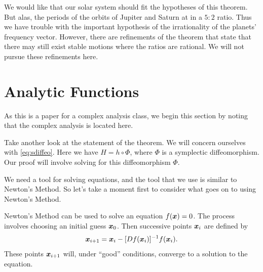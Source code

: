 \documentclass[twoside,letterpaper,10pt]{article}
\begin{document}
We would like that our solar system should fit the hypotheses of this theorem.
But alas, the periods of the orbits of Jupiter and Saturn at in a $5 : 2$ ratio.
Thus we have trouble with the important hypothesis of the irrationality of the
planets' frequency vector.
However, there are refinements of the theorem that state that there may still
exist stable motions where the ratios are rational.
We will not pursue these refinements here.

\section{Analytic Functions}
\label{sec:analytic-functions}

As this is a paper for a complex analysis class, we begin this section by noting
that the complex analysis is located here.

Take another look at the statement of the theorem.
We will concern ourselves with \cref{eq:sdiffeo}.
Here we have $H = h \circ \Phi$, where $\Phi$ is a symplectic diffeomorphism.
Our proof will involve solving for this diffeomorphism $\Phi$.

We need a tool for solving equations, and the tool that we use is similar to
Newton's Method.
So let's take a moment first to consider what goes on to using Newton's Method.

Newton's Method can be used to solve an equation $f(\bm{x}) = 0$.
The process involves choosing an initial guess $\bm{x}_0$.
Then successive points $\bm{x}_i$ are defined by
\begin{equation*}
  \bm{x}_{i+1} = \bm{x}_i - [Df(\bm{x}_i)]^{-1} f(\bm{x}_i).
\end{equation*}
These points $\bm{x}_{i+1}$ will, under ``good'' conditions, converge to a
solution to the equation.
\end{document}
